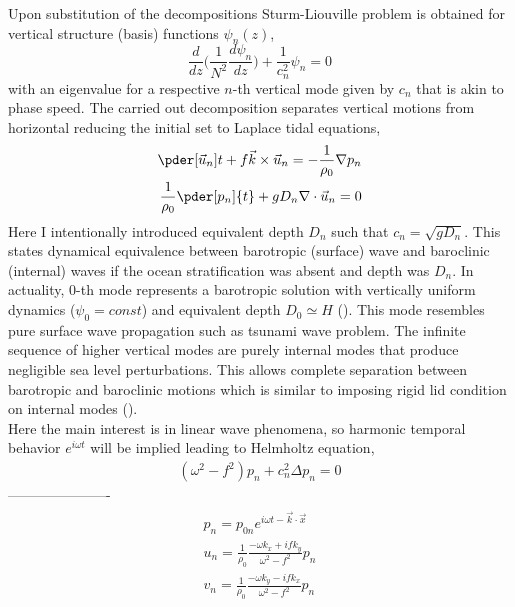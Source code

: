 Upon substitution of the decompositions Sturm-Liouville problem is obtained for vertical structure (basis) functions $\psi_n(z)$,
\begin{equation}
\frac{d}{dz}\big( \frac{1}{N^2} \frac{d \psi_n}{dz} \big) + \frac{1}{c^2_n}\psi_n = 0
\end{equation}
with an eigenvalue for a respective $n$-th vertical mode given by $c_n$ that is akin to phase speed. The carried out decomposition separates vertical motions from horizontal reducing the initial set to Laplace tidal equations,
\begin{align}
\label{In:sweq}
\begin{split}
\pder[\vec{u}_n]{t} + f \vec{k} \times \vec{u}_n = -\frac{1}{\rho_0} \nabla p_n\\
\frac{1}{\rho_0} \pder[p_n]{t} + g D_n \nabla  \cdot \vec{u}_n = 0
\end{split}
\end{align}
Here I intentionally introduced equivalent depth $D_n$ such that $c_n = \sqrt{g D_n}$. This states dynamical equivalence between barotropic (surface) wave and baroclinic (internal) waves if the ocean stratification was absent and depth was $D_n$. In actuality, $0$-th mode represents a barotropic solution with vertically uniform dynamics ($\psi_0 = const$) and equivalent depth $D_0 \simeq H$ (\cite{hendershott1981long}). This mode resembles pure surface wave propagation such as tsunami wave problem. The infinite sequence of higher vertical modes are purely internal modes that produce negligible sea level perturbations. This allows complete separation between barotropic and baroclinic motions which is similar to imposing rigid lid condition on internal modes (\cite{kundu2008fluid}).\\
Here the main interest is in linear wave phenomena, so harmonic temporal behavior $e^{i \omega t}$ will be implied leading to Helmholtz equation,
\begin{align}
\label{In:helmeq}
(\omega^2 - f^2) p_n + c_n^2 \Delta p_n = 0
\end{align}
----------------------
\begin{align}
\label{In:svw}
\begin{split}
p_n = p_{0n} e^{i \omega t - \vec{k} \cdot \vec{x}}\\
u_n = \frac{1}{\rho_0} \frac{-\omega k_x + i f k_y}{\omega^2 - f^2} p_n\\
v_n = \frac{1}{\rho_0} \frac{-\omega k_y - i f k_x}{\omega^2 - f^2} p_n
\end{split}
\end{align}
